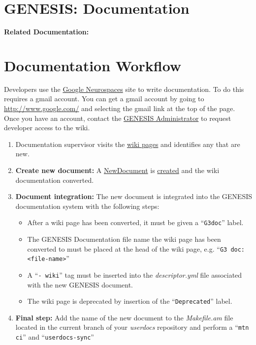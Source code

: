 \documentclass[12pt]{article}
\begin{document}
\section*{GENESIS: Documentation}

{\bf Related Documentation:}

\section*{Documentation Workflow}

Developers use the \href{http://code.google.com/p/neurospaces/wiki/Index}{Google Neurospaces} site to write documentation. To do this requires a gmail account. You can get a gmail account by going to \href{http://www.google.com/}{http://www.google.com/} and selecting the gmail link at the top of the page. Once you have an account, contact the \href{http://www.genesis-sim.org/contact}{GENESIS Administrator} to request developer access to the wiki.
\begin{enumerate}
\item Documentation supervisor visits the \href{http://code.google.com/p/neurospaces/w/list}{wiki pages} and identifies any that are new.
\item{\bf Create new document:} A \href{../NewDocument/NewDocument.tex}{NewDocument} is \href{../document-create/document-create.tex}{created} and the wiki documentation converted.
\item{\bf Document integration:} The new document is integrated into the GENESIS documentation system with the following steps:
\begin{itemize}
\item  After a wiki page has been converted, it must be given a ``{\tt G3doc}'' label.
\item The GENESIS Documentation file name the wiki page has been converted to must be placed at the head of the wiki page, e.g. ``{\tt G3 doc: <file-name>}''
\item A ``{\tt -\,wiki}'' tag must be inserted into the {\it descriptor.yml} file associated with the new GENESIS document.
\item The wiki page is deprecated by insertion of the ``{\tt Deprecated}'' label.
\end{itemize}
\item {\bf Final step:} Add the name of the new document to the {\it Makefile.am} file located in the current branch of your {\it userdocs} repository and perform a ``{\tt mtn ci}'' and ``{\tt userdocs-sync}''
\end{enumerate}
\end{document}
